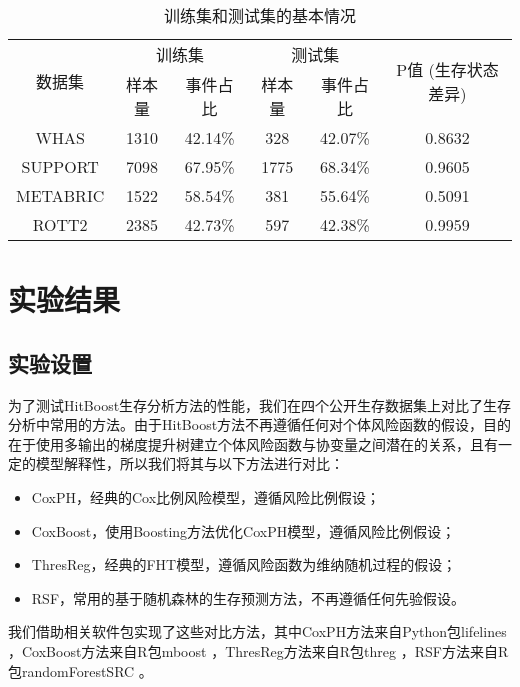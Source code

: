 \begin{table}[h]
\caption{训练集和测试集的基本情况}
\begin{tabular}{cccccc}
\toprule
\multirow{2}{*}{数据集} & \multicolumn{2}{c}{训练集} & \multicolumn{2}{c}{测试集} & \multirow{2}{*}{P值 (生存状态差异)} \\ \cline{2-5} & 样本量       & 事件占比        & 样本量       & 事件占比        & \\ 
\midrule
WHAS                 & 1310      & 42.14\%     & 328       & 42.07\%     & 0.8632              \\ 
SUPPORT              & 7098      & 67.95\%     & 1775      & 68.34\%     & 0.9605              \\ 
METABRIC             & 1522      & 58.54\%     & 381       & 55.64\%     & 0.5091              \\ 
ROTT2                & 2385      & 42.73\%     & 597       & 42.38\%     & 0.9959              \\ 
\bottomrule
\end{tabular}
\label{table02}
\end{table}

\section{实验结果}

\subsection{实验设置}
为了测试HitBoost生存分析方法的性能，我们在四个公开生存数据集上对比了生存分析中常用的方法。由于HitBoost方法不再遵循任何对个体风险函数的假设，目的在于使用多输出的梯度提升树建立个体风险函数与协变量之间潜在的关系，且有一定的模型解释性，所以我们将其与以下方法进行对比：
\begin{itemize}
  \item CoxPH，经典的Cox比例风险模型，遵循风险比例假设；
  \item CoxBoost，使用Boosting方法优化CoxPH模型，遵循风险比例假设；
  \item ThresReg，经典的FHT模型，遵循风险函数为维纳随机过程的假设；
  \item RSF，常用的基于随机森林的生存预测方法，不再遵循任何先验假设。
\end{itemize}
我们借助相关软件包实现了这些对比方法，其中CoxPH方法来自Python包lifelines ，CoxBoost方法来自R包mboost ，ThresReg方法来自R包threg ，RSF方法来自R包randomForestSRC 。


